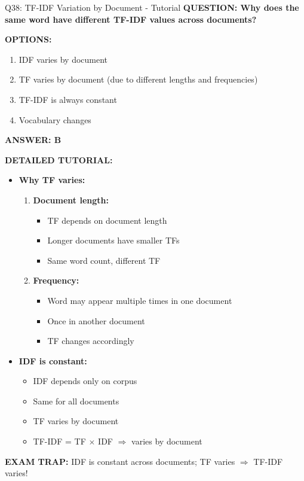 \documentclass[8pt]{beamer}
\begin{document}
	\begin{frame}{Q38: TF-IDF Variation by Document - Tutorial}
		\fontsize{6.5}{7.5}\selectfont
		\textbf{QUESTION: Why does the same word have different TF-IDF values across documents?}
		
		\vspace{0.1cm}
		\textbf{OPTIONS:}
		\begin{enumerate}
			\item IDF varies by document
			\item TF varies by document (due to different lengths and frequencies)
			\item TF-IDF is always constant
			\item Vocabulary changes
		\end{enumerate}
		
		\vspace{0.1cm}
		\textcolor{myblue}{\textbf{ANSWER: B}}
		
		\vspace{0.1cm}
		\textbf{DETAILED TUTORIAL:}
		\begin{itemize}
			\item \textbf{Why TF varies:}
			\begin{enumerate}
				\item \textbf{Document length:}
				\begin{itemize}
					\item TF depends on document length
					\item Longer documents have smaller TFs
					\item Same word count, different TF
				\end{itemize}
				\item \textbf{Frequency:}
				\begin{itemize}
					\item Word may appear multiple times in one document
					\item Once in another document
					\item TF changes accordingly
				\end{itemize}
			\end{enumerate}
			\item \textbf{IDF is constant:}
			\begin{itemize}
				\item IDF depends only on corpus
				\item Same for all documents
				\item TF varies by document
				\item TF-IDF = TF $\times$ IDF $\Rightarrow$ varies by document
			\end{itemize}
		\end{itemize}
		
		\textcolor{myred}{\textbf{EXAM TRAP:}} IDF is \textcolor{myblue}{constant across documents}; TF varies $\Rightarrow$ TF-IDF varies!
	\end{frame}
	
\end{document}
